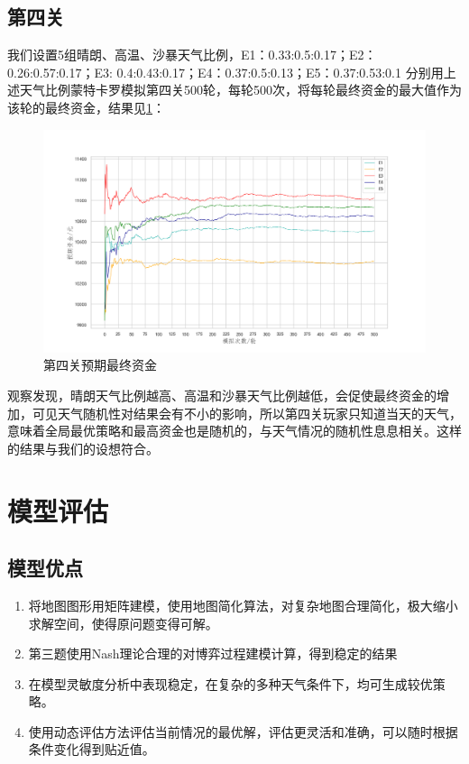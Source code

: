 \documentclass[withoutpreface,bwprint]{cumcmthesis} %
\begin{document}
\subsection{第四关}
我们设置5组晴朗、高温、沙暴天气比例，E1：0.33:0.5:0.17；E2：0.26:0.57:0.17；E3: 0.4:0.43:0.17；E4：0.37:0.5:0.13；E5：0.37:0.53:0.1
分别用上述天气比例蒙特卡罗模拟第四关500轮，每轮500次，将每轮最终资金的最大值作为该轮的最终资金，结果见\cref{fig:analysis4}：
\begin{figure}[H]
    \centering
    \includegraphics[width=1\textwidth]{figures/anaysis4.png}
    \caption{第四关预期最终资金}
    \label{fig:analysis4}
\end{figure}
观察发现，晴朗天气比例越高、高温和沙暴天气比例越低，会促使最终资金的增加，可见天气随机性对结果会有不小的影响，所以第四关玩家只知道当天的天气，意味着全局最优策略和最高资金也是随机的，与天气情况的随机性息息相关。这样的结果与我们的设想符合。

\section{模型评估}
\subsection{模型优点}
\begin{enumerate}
    \item 将地图图形用矩阵建模，使用地图简化算法，对复杂地图合理简化，极大缩小求解空间，使得原问题变得可解。
    \item 第三题使用Nash理论合理的对博弈过程建模计算，得到稳定的结果
    \item 在模型灵敏度分析中表现稳定，在复杂的多种天气条件下，均可生成较优策略。
    \item 使用动态评估方法评估当前情况的最优解，评估更灵活和准确，可以随时根据条件变化得到贴近值。
\end{enumerate}
\end{document}
